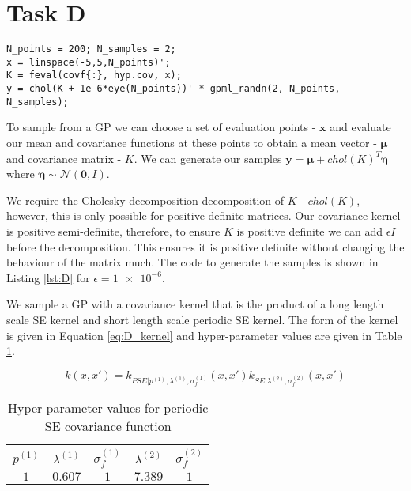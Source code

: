 \documentclass[11pt]{article}
\begin{document}
\section{Task D}

\begin{lstlisting}[caption=Code to generate samples from a GP with covariance given by covf, label=lst:D, captionpos=b, basicstyle=\small, frame=tlrb]
N_points = 200; N_samples = 2;
x = linspace(-5,5,N_points)';
K = feval(covf{:}, hyp.cov, x);
y = chol(K + 1e-6*eye(N_points))' * gpml_randn(2, N_points, N_samples);
\end{lstlisting}

To sample from a GP we can choose a set of evaluation points - $\textbf{x}$ and evaluate our mean and covariance functions at these points to obtain a mean vector - $\boldsymbol{\mu}$ and covariance matrix - $K$. We can generate our samples $\textbf{y} = \boldsymbol{\mu} + chol(K)^T \boldsymbol{\eta}$ where $\boldsymbol{\eta} \sim \mathcal{N}(\mathbf{0}, I)$.

We require the Cholesky decomposition decomposition of $K$ - $chol(K)$, however, this is only possible for positive definite matrices. Our covariance kernel is positive semi-definite, therefore, to ensure $K$ is positive definite we can add $\epsilon I$ before the decomposition. This ensures it is positive definite without changing the behaviour of the matrix much. The code to generate the samples is shown in Listing \ref{lst:D} for $\epsilon = \num{1e-6}$.

We sample a GP with a covariance kernel that is the product of a long length scale SE kernel and short length scale periodic SE kernel. The form of the kernel is given in Equation \ref{eq:D_kernel} and hyper-parameter values are given in Table \ref{table:D_product_covariance_hyper_parameters}.

\begin{equation}
    k(x, x') = k_{PSE | p^{(1)}, \lambda^{(1)}, \sigma_f^{(1)}}(x, x')k_{SE | \lambda^{(2)}, \sigma_f^{(2)}}(x, x')
    \label{eq:D_kernel}
\end{equation}

\begin{table}[h]
    \centering
    \small
    \begin{tabular}{|c|c|c|c|c|}
        \hline
        $p^{(1)}$ & $\lambda^{(1)}$ & $\sigma_f^{(1)}$ & $\lambda^{(2)}$ & $\sigma_f^{(2)}$ \\
        \hline
        $1$ & $0.607$ & $1$ & $7.389$ & $1$ \\
        \hline
    \end{tabular}
    \caption{Hyper-parameter values for periodic SE covariance function}
    \label{table:D_product_covariance_hyper_parameters}
\end{table}
\end{document}
